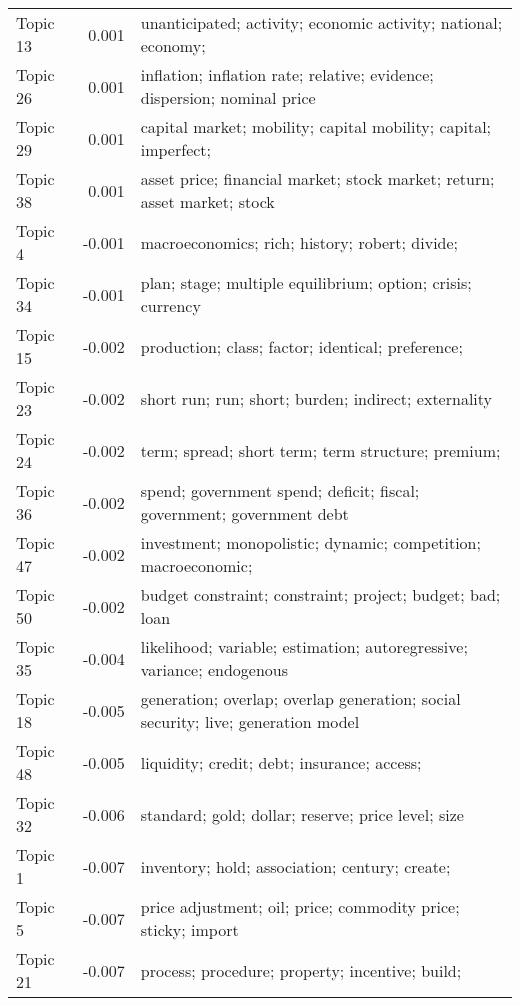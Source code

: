 \documentclass[]{elsarticle} %
\begin{document}
\begin{ThreePartTable}
\begin{longtable}[t]{>{}l>{}r>{\raggedright\arraybackslash}m{25em}}
Topic 13 & 0.001 & unanticipated;
activity;
economic
activity;
national;
economy;
\cellcolor{gray!6}{gap}\\
Topic 26 & 0.001 & inflation;
inflation
rate;
relative;
evidence;
dispersion;
nominal
price\\
\addlinespace
Topic 29 & 0.001 & capital
market;
mobility;
capital
mobility;
capital;
imperfect;
\cellcolor{gray!6}{intensity}\\
Topic 38 & 0.001 & asset
price;
financial
market;
stock
market;
return;
asset
market;
stock\\
Topic 4 & -0.001 & macroeconomics;
rich;
history;
robert;
divide;
\cellcolor{gray!6}{lead}\\
Topic 34 & -0.001 & plan;
stage;
multiple
equilibrium;
option;
crisis;
currency\\
Topic 15 & -0.002 & production;
class;
factor;
identical;
preference;
\cellcolor{gray!6}{input}\\
\addlinespace
Topic 23 & -0.002 & short
run;
run;
short;
burden;
indirect;
externality\\
Topic 24 & -0.002 & term;
spread;
short
term;
term
structure;
premium;
\cellcolor{gray!6}{structure}\\
Topic 36 & -0.002 & spend;
government
spend;
deficit;
fiscal;
government;
government
debt\\
Topic 47 & -0.002 & investment;
monopolistic;
dynamic;
competition;
macroeconomic;
\cellcolor{gray!6}{replace}\\
Topic 50 & -0.002 & budget
constraint;
constraint;
project;
budget;
bad;
loan\\
\addlinespace
Topic 35 & -0.004 & likelihood;
variable;
estimation;
autoregressive;
variance;
endogenous
\cellcolor{gray!6}{variable}\\
Topic 18 & -0.005 & generation;
overlap;
overlap
generation;
social
security;
live;
generation
model\\
Topic 48 & -0.005 & liquidity;
credit;
debt;
insurance;
access;
\cellcolor{gray!6}{investor}\\
Topic 32 & -0.006 & standard;
gold;
dollar;
reserve;
price
level;
size\\
Topic 1 & -0.007 & inventory;
hold;
association;
century;
create;
\cellcolor{gray!6}{rationally}\\
\addlinespace
Topic 5 & -0.007 & price
adjustment;
oil;
price;
commodity
price;
sticky;
import\\
Topic 21 & -0.007 & process;
procedure;
property;
incentive;
build;
\cellcolor{gray!6}{endogenous}\\

\end{longtable}
\end{ThreePartTable}
\end{document}
